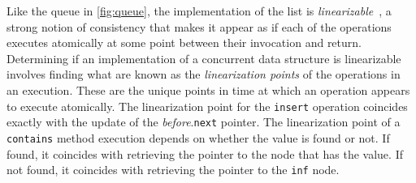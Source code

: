\documentclass{report}
\begin{document}
%
Like the queue in \autoref{fig:queue}, the implementation of the list is
\emph{linearizable}~\cite{HW90},
%
a strong notion of consistency that
makes it appear as if each of the operations executes atomically at
some point between their invocation and return.
Determining if an implementation of a concurrent data structure
is linearizable involves finding what are known as the
\emph{linearization points}
%
of the operations in an execution.  These are the unique
points in time at which an operation appears to execute atomically.
The linearization point for the \texttt{insert} operation coincides exactly with the update
of the \textit{before}.\texttt{next} pointer.
The linearization point of a \texttt{contains} method
execution depends on whether the value is found or not.
If found, it coincides with retrieving the pointer to the node
that has the value.
If not found, it coincides with retrieving the pointer to the
\texttt{inf} node.
\end{document}
